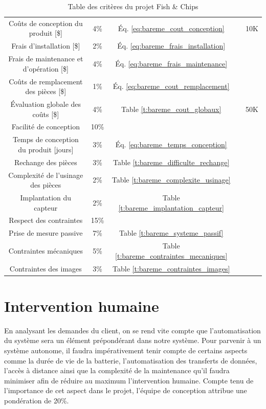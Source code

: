 \begin{table}[htp]
\begin{tabular}{|c|c|c|c|c|}
        Coûts de conception du produit [\$] & 4\% & Éq. \ref{eq:bareme_cout_conception} & & 10K \\
        Frais d'installation [\$] & 2\% & Éq. \ref{eq:bareme_frais_installation} & & \\
        Frais de maintenance et d'opération [\$] & 4\% & Éq. \ref{eq:bareme_frais_maintenance} & & \\
        Coûts de remplacement des pièces [\$] & 1\% & Éq. \ref{eq:bareme_cout_remplacement} & & \\
        Évaluation globale des coûts [\$] & 4\% & Table \ref{t:bareme_cout_globaux} & & 50K \\
        \hline\hline
        Facilité de conception & 10\% & & &\\
        \hline
        Temps de conception du produit [jours] & 3\% & Éq. \ref{eq:bareme_temps_conception} &  & \\
        Rechange des pièces & 3\% & Table \ref{t:bareme_difficulte_rechange} & & \\
        Complexité de l'usinage des pièces & 2\% & Table \ref{t:bareme_complexite_usinage} & & \\
        Implantation du capteur  & 2\% & Table \ref{t:bareme_implantation_capteur} & & \\
        \hline\hline
        Respect des contraintes & 15\% & & & \\
        \hline
        Prise de mesure passive & 7\% & Table \ref{t:bareme_systeme_passif} & & \\
        Contraintes mécaniques & 5\% & Table \ref{t:bareme_contraintes_mecaniques} & & \\
        Contraintes des images & 3\% & Table \ref{t:bareme_contraintes_images} & & \\
        \hline
   \end{tabular}
      \caption{Table des critères du projet Fish \& Chips}
\end{table}

\newpage{}

\section{Intervention humaine}

En analysant les demandes du client, on se rend vite compte que l’automatisation du système sera un élément prépondérant dans notre système. Pour parvenir à un système autonome, il faudra impérativement tenir compte de certains aspects comme la  durée de vie de la batterie, l’automatisation des transferts de données, l’accès à distance ainsi que la complexité de la maintenance qu’il faudra minimiser afin de réduire au maximum l’intervention humaine. Compte tenu de l’importance de cet aspect dans le projet, l’équipe de conception attribue une pondération de 20\%.


